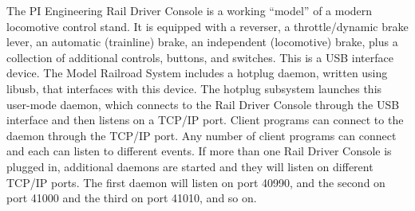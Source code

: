The PI Engineering Rail Driver Console is a working ``model'' of a
modern locomotive control stand.  It is equipped with a reverser, a
throttle/dynamic brake lever, an automatic (trainline) brake, an
independent (locomotive) brake, plus a collection of additional controls,
buttons, and switches.  This is a USB interface device.  The Model
Railroad System includes a hotplug daemon,
written using libusb, that interfaces with this device.  The hotplug
subsystem launches this user-mode daemon, which connects to the Rail Driver Console through the USB
interface and then listens on a TCP/IP port.  Client programs can
connect to the daemon through the TCP/IP port.  Any number of client
programs can connect and each can listen to different events.  If more
than one Rail Driver Console is plugged in, additional daemons are
started and they will listen on different TCP/IP ports. The first
daemon will listen on port 40990, and the second on port 41000 and the
third on port 41010, and so on.


